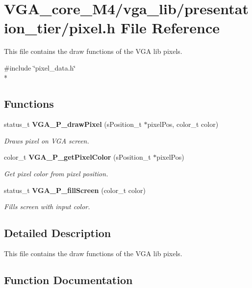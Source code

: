 \section{V\+G\+A\+\_\+core\+\_\+\+M4/vga\+\_\+lib/presentation\+\_\+tier/pixel.h File Reference}
\label{pixel_8h}


This file contains the draw functions of the V\+GA lib pixels.  


{\ttfamily \#include \char`\"{}pixel\+\_\+data.\+h\char`\"{}}\\*
\subsection*{Functions}
\begin{DoxyCompactItemize}
\item 
status\+\_\+t {\bf V\+G\+A\+\_\+\+P\+\_\+draw\+Pixel} (s\+Position\+\_\+t $\ast$pixel\+Pos, color\+\_\+t color)
\begin{DoxyCompactList}\small\item\em Draws pixel on V\+GA screen. \end{DoxyCompactList}\item 
color\+\_\+t {\bf V\+G\+A\+\_\+\+P\+\_\+get\+Pixel\+Color} (s\+Position\+\_\+t $\ast$pixel\+Pos)
\begin{DoxyCompactList}\small\item\em Get pixel color from pixel position. \end{DoxyCompactList}\item 
status\+\_\+t {\bf V\+G\+A\+\_\+\+P\+\_\+fill\+Screen} (color\+\_\+t color)
\begin{DoxyCompactList}\small\item\em Fills screen with input color. \end{DoxyCompactList}\end{DoxyCompactItemize}


\subsection{Detailed Description}
This file contains the draw functions of the V\+GA lib pixels. 



\subsection{Function Documentation}
